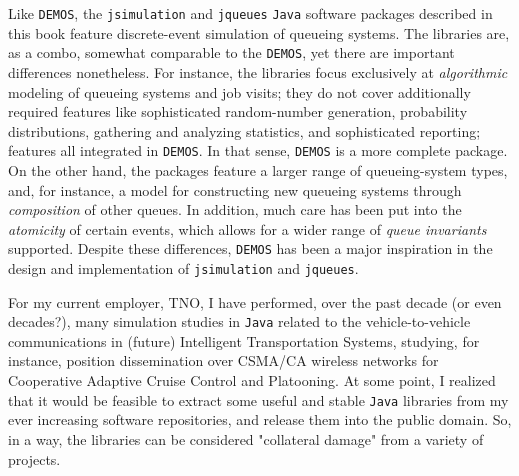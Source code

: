 Like \lstinline|DEMOS|,
  the \lstinline|jsimulation|
  and \lstinline|jqueues|
  \lstinline|Java|
  software packages described in this book
  feature discrete-event simulation
  of queueing systems.
The libraries are, as a combo,
  somewhat comparable to
  the \lstinline|DEMOS|,
  yet there are important differences nonetheless.
For instance, the libraries
  focus exclusively at {\em algorithmic\/}
  modeling of queueing systems and job visits;
  they do not cover additionally required features
  like sophisticated random-number generation,
  probability distributions,
  gathering and analyzing statistics,
  and sophisticated reporting;
  features all integrated in \lstinline|DEMOS|.
In that sense, \lstinline|DEMOS|
  is a more complete package.
On the other hand,
  the packages feature a larger range of
  queueing-system types,
  and, for instance,
  a model for constructing new queueing systems
  through {\em composition\/} of
  other queues.
In addition,
  much care has been put into the
  {\em atomicity\/} of certain events,
  which allows for a wider range of
  {\em queue invariants\/} supported.
Despite these differences,
  \lstinline|DEMOS| has been a major inspiration
  in the design and implementation of
  \lstinline|jsimulation|
  and \lstinline|jqueues|.

For my current employer, TNO,
  I have performed, over the past decade
  (or even decades?),
  many simulation studies in \lstinline|Java|
  related to the vehicle-to-vehicle communications
  in (future) Intelligent Transportation Systems,
  studying, for instance,
  position dissemination over CSMA/CA wireless networks
  for Cooperative Adaptive Cruise Control
  and Platooning.
At some point,
  I realized that it would be feasible to
  extract some useful and stable
  \lstinline|Java| libraries from my ever increasing
  software repositories,
  and release them into the public domain.
So, in a way,
  the libraries can be considered "collateral damage" from a variety of projects.

